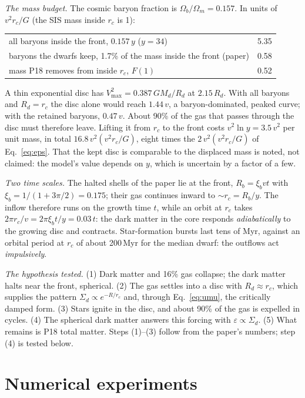\documentclass[11pt,a4paper]{article}
\theoremstyle{definition}
\theoremstyle{remark}
\newcommand{\rc}{r_c}
\newcommand{\Rd}{R_d}
\newcommand{\Rb}{R_b}
\begin{document}
\emph{The mass budget.} The cosmic baryon fraction is $\Omega_b/\Omega_m=0.157$. In units of
$v^2\rc/G$ (the SIS mass inside $\rc$ is 1):
\begin{center}\small
\begin{tabular}{lc}
\toprule
all baryons inside the front, $0.157\,y$ ($y=34$) & 5.35\\
baryons the dwarfs keep, 1.7\% of the mass inside the front (paper) & 0.58\\
mass P18 removes from inside $\rc$, $F(1)$ & 0.52\\
\bottomrule
\end{tabular}
\end{center}
A thin exponential disc has $V_{\max}^2=0.387\,GM_d/\Rd$ at $2.15\,\Rd$. With all baryons and
$\Rd=\rc$ the disc alone would reach $1.44\,v$, a baryon-dominated, peaked curve; with the
retained baryons, $0.47\,v$. About 90\% of the gas that passes through the disc must therefore
leave. Lifting it from $\rc$ to the front costs $v^2\ln y=3.5\,v^2$ per unit mass, in total
$16.8\,v^2(v^2\rc/G)$, eight times the $2\,v^2(v^2\rc/G)$ of Eq.~\eqref{eq:eps}. That the kept
disc is comparable to the displaced mass is noted, not claimed: the model's value depends on
$y$, which is uncertain by a factor of a few.

\emph{Two time scales.} The halted shells of the paper lie at the front,
$\Rb=\xi_bvt$ with $\xi_b=1/(1+3\pi/2)=0.175$; their gas continues inward to $\sim\rc=\Rb/y$.
The inflow therefore runs on the growth time $t$, while an orbit at $\rc$ takes
$2\pi\rc/v=2\pi\xi_b t/y=0.03\,t$: the dark matter in the core responds \emph{adiabatically}
to the growing disc and contracts. Star-formation bursts last tens of Myr, against an orbital
period at $\rc$ of about 200\,Myr for the median dwarf: the outflows act \emph{impulsively}.

\emph{The hypothesis tested.} (1) Dark matter and 16\% gas collapse; the dark matter halts near
the front, spherical. (2) The gas settles into a disc with $\Rd\approx\rc$, which supplies the
pattern $\Sigma_d\propto e^{-R/\rc}$ and, through Eq.~\eqref{eq:umu}, the critically damped
form. (3) Stars ignite in the disc, and about 90\% of the gas is expelled in cycles. (4) The
spherical dark matter answers this forcing with $\varepsilon\propto\Sigma_d$. (5) What remains
is P18 total matter. Steps (1)--(3) follow from the paper's numbers; step (4) is tested below.

\section{Numerical experiments}\label{sec:runs}
\end{document}
